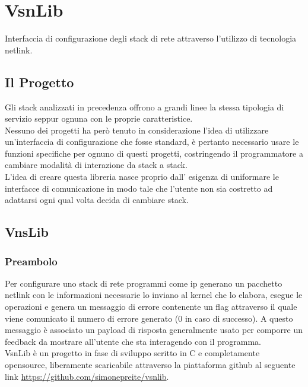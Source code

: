 

\chapter{VsnLib}                %
\lhead[\fancyplain{}{\bfseries\thepage}]{\fancyplain{}{\bfseries\rightmark}}
Interfaccia di configurazione degli stack di rete attraverso l'utilizzo di tecnologia netlink.
\section{Il Progetto}                 %
Gli stack analizzati in precedenza offrono a grandi linee la stessa tipologia di servizio seppur ognuna con le proprie caratteristice.\\
Nessuno dei progetti ha per\`o tenuto in considerazione l'idea di utilizzare un'interfaccia di configurazione che fosse standard, \`e pertanto necessario usare le funzioni specifiche per ognuno di questi progetti, costringendo il programmatore a cambiare modalit\`a di interazione da stack a stack.\\
L'idea di creare questa libreria nasce proprio dall' esigenza di uniformare le interfacce di comunicazione in modo tale che l'utente non sia costretto ad adattarsi ogni qual volta decida di cambiare stack.\\
\section{VnsLib}
\subsection{Preambolo}
Per configurare uno stack di rete programmi come ip generano un pacchetto netlink con le informazioni necessarie lo inviano al kernel che lo elabora, esegue le operazioni e genera un messaggio di errore contenente un flag attraverso il quale viene comunicato il numero di errore generato (0 in caso di successo). A questo messaggio \`e associato un payload di risposta generalmente usato per comporre un feedback da mostrare all'utente che sta interagendo con il programma.\\
VsnLib \`e un progetto in fase di sviluppo scritto in C e completamente opensource, liberamente scaricabile attraverso la piattaforma github al seguente link \url{https://github.com/simonepreite/vsnlib}.

